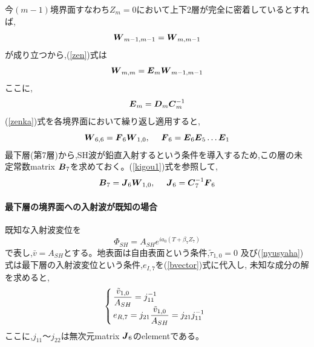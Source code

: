 \documentclass[titlepage]{jsarticle}
\def\dfrac#1#2{{\displaystyle\frac{#1}{#2}}}
\begin{document}
今$(m-1)$境界面すなわち$Z_m = 0$において上下2層が完全に密着しているとすれば,
\begin{equation}
\mbox{\boldmath $W$} _{m-1,m-1} = \mbox{\boldmath $W$} _{m,m-1} \label{renzoku}
\end{equation}
が成り立つから,(\ref{zen})式は
\begin{equation}
\mbox{\boldmath $W$} _{m,m} = \mbox{\boldmath $E$} _m \mbox{\boldmath $W$} _{m-1,m-1}
\label{zenka}
\end{equation}
ここに,
\begin{equation}
\mbox{\boldmath $E$} _m = \mbox{\boldmath $D$} _m \mbox{\boldmath $C$} ^{-1}_m \label{chu}
\end{equation}
(\ref{zenka})式を各境界面において繰り返し適用すると,
\begin{equation}
\mbox{\boldmath $W$} _{6,6} = \mbox{\boldmath $F$} _6 \mbox{\boldmath $W$} _{1,0}, ~~~~
\mbox{\boldmath $F$} _6 = \mbox{\boldmath $E$} _6 \mbox{\boldmath $E$} _5
                            \ldots \mbox{\boldmath $E$} _1 \label{kiban-hyoso}
\end{equation}
最下層(第7層)から,SH波が鉛直入射するという条件を導入するため,この層の未定常数matrix
$\mbox{\boldmath $B$} _7$を求めておく。(\ref{kigou1})式を参照して,
\begin{equation}
\mbox{\boldmath $B$} _7 = \mbox{\boldmath $J$} _6 \mbox{\boldmath $W$} _{1,0}, ~~~~
\mbox{\boldmath $J$} _6 = \mbox{\boldmath $C$} ^{-1}_7 \mbox{\boldmath $F$} _6 \label{bvector}
\end{equation}
\paragraph{最下層の境界面への入射波が既知の場合}
既知な入射波変位を
\begin{equation}
\Phi _{SH} = A_{SH} e^{ia_0 (T+\beta _7 Z_7)} \label{nyusyaha}
\end{equation}
で表し,$\bar{v} = A_{SH}$とする。地表面は自由表面という条件,$\tilde{\tau }_{1,0} = 0$
及び(\ref{nyusyaha})式は最下層の入射波変位という条件,$e_{I,7}$を(\ref{bvector})式に代入し,
未知な成分の解を求めると,
\begin{equation} 
\left\{ \begin{array}{@{\,}l}
\dfrac{\tilde{v}_{1,0}}{A_{SH}} = j^{-1}_{11} \\
e_{R,7} = j_{21} \dfrac{\tilde{v}_{1,0}}{A_{SH}} = j_{21} j^{-1}_{11} \end{array}
\right. \label{michi}
\end{equation}
ここに,$j_{11}$〜$j_{22}$は無次元matrix $\mbox{\boldmath $J$} _6$のelementである。
\end{document}
